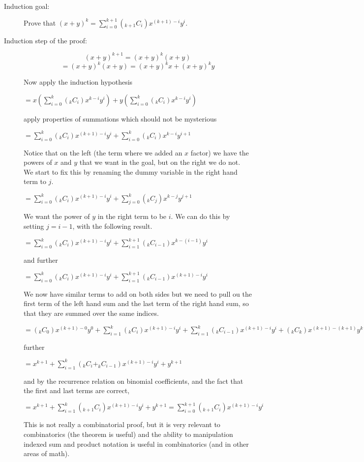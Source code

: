 \documentclass[12pt]{article}
\begin{document}
\begin{description}
\begin{description}
\item[Induction goal:]  Prove that $(x+y)^k = \sum_{i=0}^{k+1}(_{k+1}C_i)x^{(k+1)-i}y^i$.

\item[Induction step of the proof:]  $$(x+y)^{k+1} = (x+y)^k(x+y)$$ $$ = (x+y)^k(x+y)= (x+y)^kx + (x+y)^ky$$

Now apply the induction hypothesis

$= x(\sum_{i=0}^k(_kC_i)x^{k-i}y^i) + y(\sum_{i=0}^k(_kC_i)x^{k-i}y^i)$

apply properties of summations which should not be mysterious

$=\sum_{i=0}^k(_kC_i)x^{(k+1)-i}y^i + \sum_{i=0}^k(_kC_i)x^{k-i}y^{i+1}$

Notice that on the left (the term where we added an $x$ factor) we have the powers of $x$ and $y$ that we want in the goal, but on the right we do not.  We start to fix this by renaming the dummy variable in the right hand term to $j$.

$=\sum_{i=0}^k(_kC_i)x^{(k+1)-i}y^i + \sum_{j=0}^k(_kC_j)x^{k-j}y^{j+1}$

We want the power of $y$ in the right term to be $i$.  We can do this by setting $j=i-1$, with the following result.

$=\sum_{i=0}^k(_kC_i)x^{(k+1)-i}y^i + \sum_{i=1}^{k+1}(_kC_{i-1})x^{k-(i-1)}y^{i}$

and further

$=\sum_{i=0}^k(_kC_i)x^{(k+1)-i}y^i + \sum_{i=1}^{k+1}(_kC_{i-1})x^{(k+1)-i}y^{i}$


We now have similar terms to add on both sides but we need to pull ou the first term of the left hand sum and the last term of the right hand sum, so that they are summed over the same indices.

$ = (_kC_0)x^{(k+1)-0}y^0 + \sum_{i=1}^k(_kC_i)x^{(k+1)-i}y^i + \sum_{i=1}^{k}(_kC_{i-1})x^{(k+1)-i}y^{i}+ (_kC_{k})x^{(k+1)-(k+1)}y^{k+1}$

further

$=x^{k+1} + \sum_{i=1}^k (_kC_i + _kC_{i-1})x^{(k+1)-i}y^i + y^{k+1}$


and by the recurrence relation on binomial coefficients, and the fact that the first and last terms are correct, 

$=x^{k+1} + \sum_{i=1}^k (_{k+1}C_i)x^{(k+1)-i}y^i + y^{k+1} = \sum_{i=0}^{k+1}(_{k+1}C_i)x^{(k+1)-i}y^i$


This is not really a combinatorial proof, but it is very relevant to combinatorics (the theorem is useful) and the ability to manipulation indexed sum and product notation is useful in combinatorics (and in other areas of math).


\end{description}
\end{description}
\end{document}
